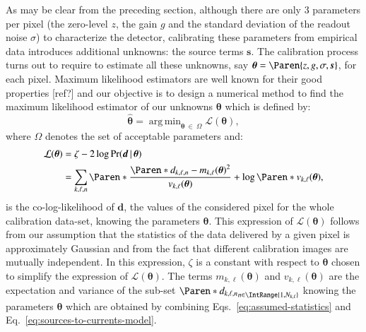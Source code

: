 \documentclass{aa}
\newcommand{\oops}[1]{\textcolor[named]{OrangeRed1}{#1}}
\newcommand*{\given}{\,\vert\,} %
\DeclareMathOperator*{\argmin}{arg\,min}
\newcommand*{\estim}[1]{\hat{#1}}
\newcommand*{\V}[1]{\boldsymbol{#1}}   %
\newcommand*{\MC}[1]{\mathcal{#1}}
\newcommand*{\lkl}{\MC{L}}
\begin{document}
As may be clear from the preceding section, although there are only 3 parameters
per pixel (the zero-level $z$, the gain $g$ and the standard deviation of the
readout noise $\sigma$) to characterize the detector, calibrating these
parameters from empirical data introduces additional unknowns: the source terms
$\V s$. The calibration process turns out to require to estimate all these
unknowns, say $\V\theta=\Paren{z,g,\sigma,\V s}$, for each pixel.  Maximum
likelihood estimators are well known for their good properties \oops{[ref?]} and
our objective is to design a numerical method to find the maximum likelihood
estimator of our unknowns $\V\theta$ which is defined by:
\begin{equation}
  \label{eq:maximum-likelihood-parameters}
  \estim{\V\theta} = \argmin_{\V\theta\:\in\:\Omega}\lkl(\V\theta),
\end{equation}
where $\Omega$ denotes the set of acceptable parameters and:
\begin{align}
  \lkl(\V\theta)
  &= \zeta - 2\log\Pr(\V d\given\V\theta) \notag\\
  &= \sum_{k,\ell,n}\Paren*{
    \frac{\Paren*{d_{k,\ell,n} -
        m_{k,\ell}(\V\theta)}^2}{v_{k,\ell}(\V\theta)}
    + \log\Paren*{v_{k,\ell}(\V\theta)}
  },
  \label{eq:cologlikelihood}
\end{align}
is the co-log-likelihood of $\V d$, the values of the considered pixel for the
whole calibration data-set, knowing the parameters $\V\theta$.  This expression
of $\lkl(\V\theta)$ follows from our assumption that the statistics of the data
delivered by a given pixel is approximately Gaussian and from the fact that
different calibration images are mutually independent.  In this expression,
$\zeta$ is a constant with respect to $\V\theta$ chosen to simplify the
expression of $\lkl(\V\theta)$.  The terms $m_{k,\ell}(\V\theta)$ and
$v_{k,\ell}(\V\theta)$ are the expectation and variance of the sub-set
$\Paren*{d_{k,\ell,n}}_{n\in\IntRange{1,N_{k,\ell}}}$ knowing the parameters
$\V\theta$ which are obtained by combining Eqs.~\eqref{eq:assumed-statistics}
and Eq.~\eqref{eq:sources-to-currents-model}.
\end{document}
